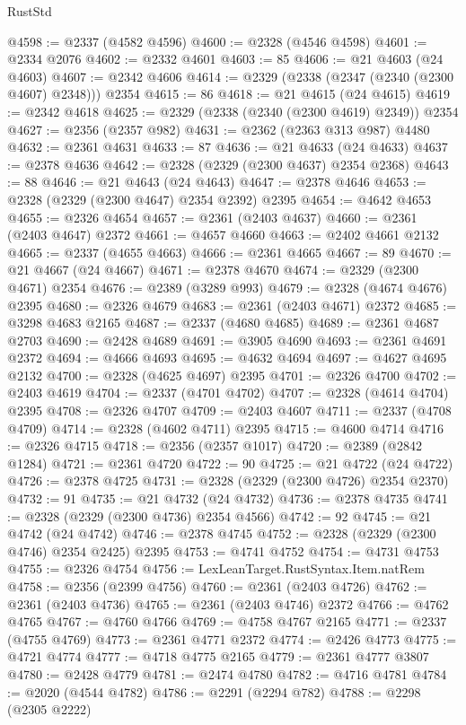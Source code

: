 \begin{lexlean}{RustStd}
\begin{coremodule}
{\begin{coremodule}
{{{{{{{{{{{{{{{{{{{{{{{{{{{{{{{{{{{{{@4598 := @2337 (@4582 @4596)
@4600 := @2328 (@4546 @4598)
@4601 := @2334 @2076
@4602 := @2332 @4601
@4603 := 85
@4606 := @21 @4603 (@24 @4603)
@4607 := @2342 @4606
@4614 := @2329 (@2338 (@2347 (@2340 (@2300 @4607) @2348))) @2354
@4615 := 86
@4618 := @21 @4615 (@24 @4615)
@4619 := @2342 @4618
@4625 := @2329 (@2338 (@2340 (@2300 @4619) @2349)) @2354
@4627 := @2356 (@2357 @982)
@4631 := @2362 (@2363 @313 @987) @4480
@4632 := @2361 @4631
@4633 := 87
@4636 := @21 @4633 (@24 @4633)
@4637 := @2378 @4636
@4642 := @2328 (@2329 (@2300 @4637) @2354 @2368)
@4643 := 88
@4646 := @21 @4643 (@24 @4643)
@4647 := @2378 @4646
@4653 := @2328 (@2329 (@2300 @4647) @2354 @2392) @2395
@4654 := @4642 @4653
@4655 := @2326 @4654
@4657 := @2361 (@2403 @4637)
@4660 := @2361 (@2403 @4647) @2372
@4661 := @4657 @4660
@4663 := @2402 @4661 @2132
@4665 := @2337 (@4655 @4663)
@4666 := @2361 @4665
@4667 := 89
@4670 := @21 @4667 (@24 @4667)
@4671 := @2378 @4670
@4674 := @2329 (@2300 @4671) @2354
@4676 := @2389 (@3289 @993)
@4679 := @2328 (@4674 @4676) @2395
@4680 := @2326 @4679
@4683 := @2361 (@2403 @4671) @2372
@4685 := @3298 @4683 @2165
@4687 := @2337 (@4680 @4685)
@4689 := @2361 @4687 @2703
@4690 := @2428 @4689
@4691 := @3905 @4690
@4693 := @2361 @4691 @2372
@4694 := @4666 @4693
@4695 := @4632 @4694
@4697 := @4627 @4695 @2132
@4700 := @2328 (@4625 @4697) @2395
@4701 := @2326 @4700
@4702 := @2403 @4619
@4704 := @2337 (@4701 @4702)
@4707 := @2328 (@4614 @4704) @2395
@4708 := @2326 @4707
@4709 := @2403 @4607
@4711 := @2337 (@4708 @4709)
@4714 := @2328 (@4602 @4711) @2395
@4715 := @4600 @4714
@4716 := @2326 @4715
@4718 := @2356 (@2357 @1017)
@4720 := @2389 (@2842 @1284)
@4721 := @2361 @4720
@4722 := 90
@4725 := @21 @4722 (@24 @4722)
@4726 := @2378 @4725
@4731 := @2328 (@2329 (@2300 @4726) @2354 @2370)
@4732 := 91
@4735 := @21 @4732 (@24 @4732)
@4736 := @2378 @4735
@4741 := @2328 (@2329 (@2300 @4736) @2354 @4566)
@4742 := 92
@4745 := @21 @4742 (@24 @4742)
@4746 := @2378 @4745
@4752 := @2328 (@2329 (@2300 @4746) @2354 @2425) @2395
@4753 := @4741 @4752
@4754 := @4731 @4753
@4755 := @2326 @4754
@4756 := LexLeanTarget.RustSyntax.Item.natRem
@4758 := @2356 (@2399 @4756)
@4760 := @2361 (@2403 @4726)
@4762 := @2361 (@2403 @4736)
@4765 := @2361 (@2403 @4746) @2372
@4766 := @4762 @4765
@4767 := @4760 @4766
@4769 := @4758 @4767 @2165
@4771 := @2337 (@4755 @4769)
@4773 := @2361 @4771 @2372
@4774 := @2426 @4773
@4775 := @4721 @4774
@4777 := @4718 @4775 @2165
@4779 := @2361 @4777 @3807
@4780 := @2428 @4779
@4781 := @2474 @4780
@4782 := @4716 @4781
@4784 := @2020 (@4544 @4782)
@4786 := @2291 (@2294 @782)
@4788 := @2298 (@2305 @2222)
}}}}}}}}}}}}}}}}}}}}}}}}}}}}}}}}}}}}}
\end{coremodule}}
\end{coremodule}
\end{lexlean}
